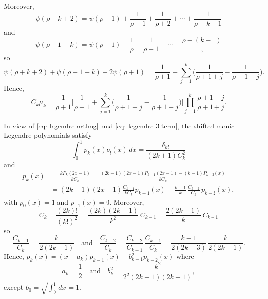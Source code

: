 \documentclass[12pt,a4paper]{article}
\begin{document}
Moreover,
\[
\psi(\rho+k+2)=\psi(\rho+1)+\frac{1}{\rho+1}+\frac{1}{\rho+2}
	+\cdots+\frac{1}{\rho+k+1}
\]
and
\[
\psi(\rho+1-k)=\psi(\rho+1)-\frac{1}{\rho}-\frac{1}{\rho-1}
	-\cdots-\frac{\rho-(k-1)},
\]
so
\[
\psi(\rho+k+2)+\psi(\rho+1-k)-2\psi(\rho+1)
	=\frac{1}{\rho+1}+\sum_{j=1}^k\biggl(\frac{1}{\rho+1+j}
		-\frac{1}{\rho+1-j}\biggr).
\]
Hence,
\[
C_k\mu_k=\frac{1}{\rho+1}\biggl[\frac{1}{\rho+1}
	+\sum_{j=1}^k\biggl(\frac{1}{\rho+1+j}
		-\frac{1}{\rho+1-j}\biggr)\biggr]
	\prod_{j=1}^k\frac{\rho+1-j}{\rho+1+j}.
\]

In view of \eqref{eq: legendre orthog}~and 
\eqref{eq: legendre 3 term}, the shifted monic Legendre polynomials 
satisfy
\[
\int_0^1p_k(x)p_l(x)\,dx=\frac{\delta_{kl}}{(2k+1)C_k^2}
\]
and
\begin{align*}
p_k(x)&=\frac{kP_k(2x-1)}{kC_k}
	=\frac{(2k-1)(2x-1)P_{k-1}(2x-1)-(k-1)P_{k-2}(x)}{kC_k}\\
	&=(2k-1)(2x-1)\frac{C_{k-1}}{kC_k}p_{k-1}(x)
		-\frac{k-1}{k}\,\frac{C_{k-2}}{C_k}\,p_{k-2}(x),
\end{align*}
with $p_0(x)=1$ and $p_{-1}(x)=0$.  Moreover,
\[
C_k=\frac{(2k)!}{(k!)^2}=\frac{(2k)(2k-1)}{k^2}\,C_{k-1}
	=\frac{2(2k-1)}{k}\,C_{k-1}
\]
so
\[
\frac{C_{k-1}}{C_k}=\frac{k}{2(2k-1)}
\quad\text{and}\quad
\frac{C_{k-2}}{C_k}=\frac{C_{k-2}}{C_{k-1}}\,\frac{C_{k-1}}{C_k}
	=\frac{k-1}{2(2k-3)}\,\frac{k}{2(2k-1)}.
\]
Hence, $p_k(x)=(x-a_k)p_{k-1}(x)-b_{k-1}^2p_{k-2}(x)$ where
\[
a_k=\frac{1}{2}\quad\text{and}\quad
b_k^2=\frac{k^2}{2^2(2k-1)(2k+1)},
\]
except $b_0=\sqrt{\int_0^1\,dx}=1$.










\end{document}
